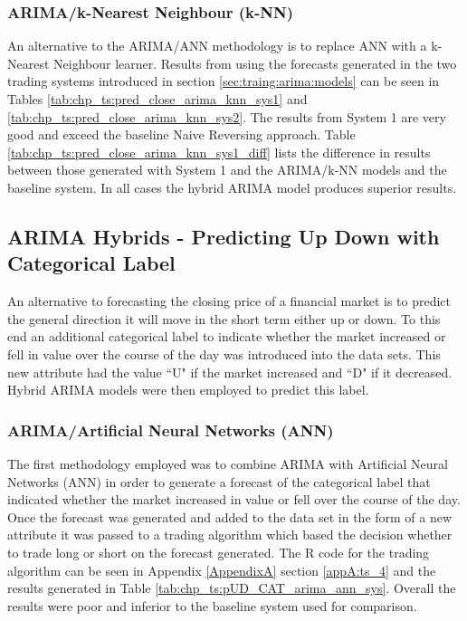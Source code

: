 

\subsubsection{ARIMA/k-Nearest Neighbour (k-NN)}
An alternative to the ARIMA/ANN methodology is to replace ANN with a k-Nearest Neighbour learner. Results from using the forecasts generated in the two trading systems introduced in section \ref{sec:traing:arima:models} can be seen in Tables \ref{tab:chp_ts:pred_close_arima_knn_sys1} and \ref{tab:chp_ts:pred_close_arima_knn_sys2}. The results from System 1 are very good and exceed the baseline Naive Reversing approach. Table \ref{tab:chp_ts:pred_close_arima_knn_sys1_diff} lists the difference in results between those generated with System 1 and the ARIMA/k-NN models and the baseline system. In all cases the hybrid ARIMA model produces superior results.



\subsection{ARIMA Hybrids - Predicting Up Down with Categorical Label}
An alternative to forecasting the closing price of a financial market is to predict the general direction it will move in the short term either up or down. To this end an additional categorical label to indicate whether the market increased or fell in value over the course of the day was introduced into the data sets. This new attribute had the value  \textquotedblleft U" if the market increased and \textquotedblleft D" if it decreased. Hybrid ARIMA models were then employed to predict this label.

\subsubsection{ARIMA/Artificial Neural Networks (ANN)}
The first methodology employed was to combine ARIMA with Artificial Neural Networks (ANN) in order to generate a forecast of the categorical label that indicated whether the market increased in value or fell over the course of the day. Once the forecast was generated and added to the data set in the form of a new attribute it was passed to a trading algorithm which based the decision whether to trade long or short on the forecast generated. The R code for the trading algorithm can be seen in Appendix \ref{AppendixA} section \ref{appA:ts_4} and the results generated in Table \ref{tab:chp_ts:pUD_CAT_arima_ann_sys}. Overall the results were poor and inferior to the baseline system used for comparison. 


